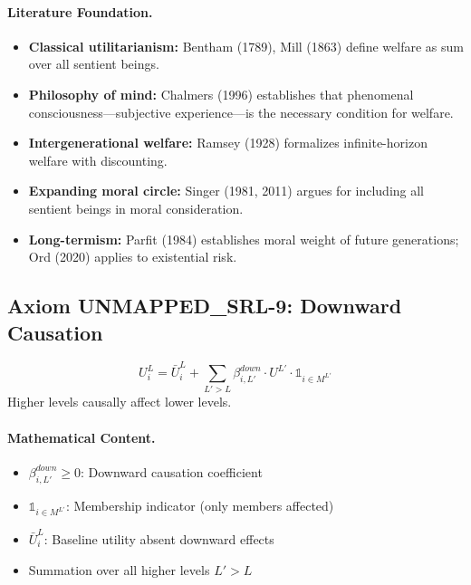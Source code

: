 \paragraph{Literature Foundation.}
\begin{itemize}
\item \textbf{Classical utilitarianism:} Bentham (1789), Mill (1863) define 
welfare as sum over all sentient beings.
\item \textbf{Philosophy of mind:} Chalmers (1996) establishes that phenomenal 
consciousness---subjective experience---is the necessary condition for welfare.
\item \textbf{Intergenerational welfare:} Ramsey (1928) formalizes infinite-horizon 
welfare with discounting.
\item \textbf{Expanding moral circle:} Singer (1981, 2011) argues for including 
all sentient beings in moral consideration.
\item \textbf{Long-termism:} Parfit (1984) establishes moral weight of future 
generations; Ord (2020) applies to existential risk.
\end{itemize}

\subsection{Axiom UNMAPPED_SRL-9: Downward Causation}

\begin{tcolorbox}[colback=gray!5!white, colframe=gray!75!black, title=Axiom UNMAPPED_SRL-9: Downward Causation]
\begin{equation}
\boxed{
U^L_i = \bar{U}^L_i + \sum_{L' > L} \beta^{down}_{i,L'} \cdot U^{L'} \cdot \mathbb{1}_{i \in M^{L'}}
}
\end{equation}
Higher levels causally affect lower levels.
\end{tcolorbox}

\paragraph{Mathematical Content.}
\begin{itemize}
\item $\beta^{down}_{i,L'} \geq 0$: Downward causation coefficient
\item $\mathbb{1}_{i \in M^{L'}}$: Membership indicator (only members affected)
\item $\bar{U}^L_i$: Baseline utility absent downward effects
\item Summation over all higher levels $L' > L$
\end{itemize}

